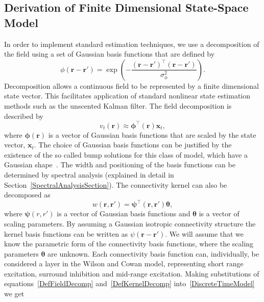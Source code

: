 \documentclass[twocolumn,11pt,a4paper]{article}		%
\begin{document}
\subsection{Derivation of Finite Dimensional State-Space Model} 
In order to implement standard estimation techniques, we use a decomposition of the field using a set of Gaussian basis functions that are defined by
\begin{equation}\label{eq:FieldBasisFunction}
	\phi\left(\mathbf{r}-\mathbf{r}'\right) =
\exp{\left(-\frac{(\mathbf{r}-\mathbf{r}')^\top(\mathbf{r}-\mathbf{r}')}{\sigma_{\phi}^2}\right)}. 
\end{equation}
Decomposition allows a continuous field to be represented by a finite dimensional state vector. This facilitates application of standard nonlinear state estimation methods such as the unscented Kalman filter. The field decomposition is described by 
\begin{equation}
	\label{DefFieldDecomp} v_t\left(\mathbf{r}\right) \approx \boldsymbol{\phi}^{\top}\left(\mathbf{r}\right) \mathbf{x}_t, 
\end{equation}
where $\mathbf{\boldsymbol{\phi}}(\mathbf{r})$ is a vector of Gaussian basis functions that are scaled by the state vector, $\mathbf{x}_t$. The choice of Gaussian basis functions can be justified by the existence of the so called bump solutions for this class of model, which have a Gaussian shape~\cite{Coombes2005}. The width and positioning of the basis functions can be determined by spectral analysis (explained in detail in Section~\ref{SpectralAnalysisSection}). The connectivity kernel can also be decomposed as 
\begin{equation}\label{DefKernelDecomp}
	 w\left(\mathbf{r},\mathbf{r}'\right) =\boldsymbol{\psi}^\top\left(\mathbf{r},\mathbf{r}'\right) \boldsymbol{\theta},
\end{equation}
where $\boldsymbol{\psi}(r,r')$ is a vector of Gaussian basis functions and $\boldsymbol{\theta}$ is a vector of scaling parameters. By assuming a Gaussian isotropic connectivity structure the kernel basis functions can be written as $\psi(\mathbf{r}-\mathbf{r}')$. We will assume that we know the parametric form of the connectivity basis functions, where the scaling parameters $\boldsymbol{\theta}$ are unknown. Each connectivity basis function can, individually, be considered a layer in the Wilson and Cowan model, representing short range excitation, surround inhibition and mid-range excitation. Making substitutions of equations~\ref{DefFieldDecomp} and~\ref{DefKernelDecomp} into~\ref{DiscreteTimeModel} we get 
\end{document}

